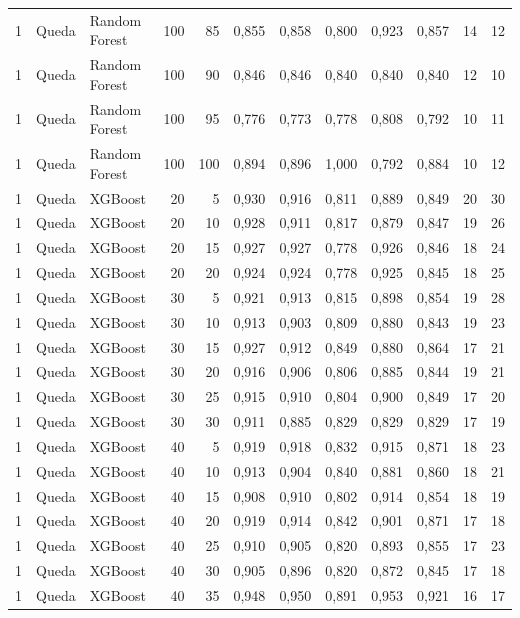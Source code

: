 \begin{longtable}{@{}rllrrrrrrrrr@{}}
1 & Queda & Random Forest & 100 & 85 & 0,855 & 0,858 & 0,800 & 0,923 & 0,857 & 14 & 12 \\
1 & Queda & Random Forest & 100 & 90 & 0,846 & 0,846 & 0,840 & 0,840 & 0,840 & 12 & 10 \\
1 & Queda & Random Forest & 100 & 95 & 0,776 & 0,773 & 0,778 & 0,808 & 0,792 & 10 & 11 \\
1 & Queda & Random Forest & 100 & 100 & 0,894 & 0,896 & 1,000 & 0,792 & 0,884 & 10 & 12 \\
1 & Queda & XGBoost & 20 & 5 & 0,930 & 0,916 & 0,811 & 0,889 & 0,849 & 20 & 30 \\
1 & Queda & XGBoost & 20 & 10 & 0,928 & 0,911 & 0,817 & 0,879 & 0,847 & 19 & 26 \\
1 & Queda & XGBoost & 20 & 15 & 0,927 & 0,927 & 0,778 & 0,926 & 0,846 & 18 & 24 \\
1 & Queda & XGBoost & 20 & 20 & 0,924 & 0,924 & 0,778 & 0,925 & 0,845 & 18 & 25 \\
1 & Queda & XGBoost & 30 & 5 & 0,921 & 0,913 & 0,815 & 0,898 & 0,854 & 19 & 28 \\
1 & Queda & XGBoost & 30 & 10 & 0,913 & 0,903 & 0,809 & 0,880 & 0,843 & 19 & 23 \\
1 & Queda & XGBoost & 30 & 15 & 0,927 & 0,912 & 0,849 & 0,880 & 0,864 & 17 & 21 \\
1 & Queda & XGBoost & 30 & 20 & 0,916 & 0,906 & 0,806 & 0,885 & 0,844 & 19 & 21 \\
1 & Queda & XGBoost & 30 & 25 & 0,915 & 0,910 & 0,804 & 0,900 & 0,849 & 17 & 20 \\
1 & Queda & XGBoost & 30 & 30 & 0,911 & 0,885 & 0,829 & 0,829 & 0,829 & 17 & 19 \\
1 & Queda & XGBoost & 40 & 5 & 0,919 & 0,918 & 0,832 & 0,915 & 0,871 & 18 & 23 \\
1 & Queda & XGBoost & 40 & 10 & 0,913 & 0,904 & 0,840 & 0,881 & 0,860 & 18 & 21 \\
1 & Queda & XGBoost & 40 & 15 & 0,908 & 0,910 & 0,802 & 0,914 & 0,854 & 18 & 19 \\
1 & Queda & XGBoost & 40 & 20 & 0,919 & 0,914 & 0,842 & 0,901 & 0,871 & 17 & 18 \\
1 & Queda & XGBoost & 40 & 25 & 0,910 & 0,905 & 0,820 & 0,893 & 0,855 & 17 & 23 \\
1 & Queda & XGBoost & 40 & 30 & 0,905 & 0,896 & 0,820 & 0,872 & 0,845 & 17 & 18 \\
1 & Queda & XGBoost & 40 & 35 & 0,948 & 0,950 & 0,891 & 0,953 & 0,921 & 16 & 17 \\

\end{longtable}

